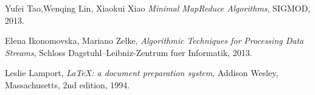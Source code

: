 \begin{thebibliography}{9}

  Yufei Tao,Wenqing Lin, Xiaokui Xiao
  \emph{Minimal MapReduce Algorithms},
  SIGMOD,
  2013.

  Elena Ikonomovska, Mariano Zelke,
  \emph{Algorithmic Techniques for Processing Data Streams},
  Schloss Dagstuhl--Leibniz-Zentrum fuer Informatik,
  2013.
  
  
  Leslie Lamport,
  \emph{\LaTeX: a document preparation system},
  Addison Wesley, Massachusetts,
  2nd edition,
  1994.

\end{thebibliography}